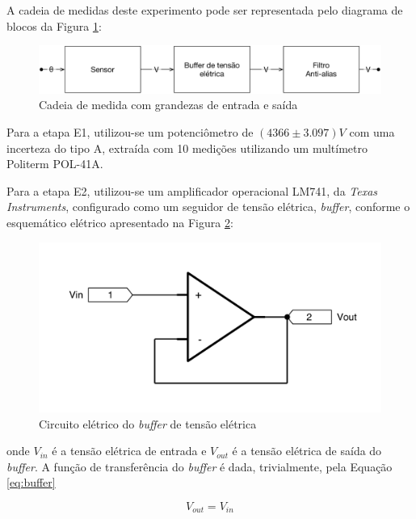 \documentclass[a4paper]{instrumentacao}
\begin{document}
A cadeia de medidas deste experimento pode ser representada pelo diagrama de blocos da Figura \ref{fig:pendulo-cadeia-medidas}:

\begin{figure}[H]
\centering
\includegraphics[width=\textwidth]{Cadeia de medida.pdf}
\caption{Cadeia de medida com grandezas de entrada e saída}
\label{fig:pendulo-cadeia-medidas}
\end{figure}

Para a etapa E1, utilizou-se um potenciômetro de $(4366 \pm 3.097) V$ com uma incerteza do tipo A, extraída com 10 medições utilizando um multímetro Politerm POL-41A.

Para a etapa E2, utilizou-se um amplificador operacional LM741\cite{datasheet-lm741}, da \textit{Texas Instruments}, configurado como um seguidor de tensão elétrica, \textit{buffer}, conforme o esquemático elétrico apresentado na Figura \ref{fig:buffer-tensão}:

\begin{figure}[H]
\centering
\includegraphics[width=\textwidth]{Buffer-tensao.pdf}
\caption{Circuito elétrico do \textit{buffer} de tensão elétrica}
\label{fig:buffer-tensão}
\end{figure}

\noindent
onde $V_{in}$ é a tensão elétrica de entrada e $V_{out}$ é a tensão elétrica de saída do \textit{buffer}. A função de transferência do \textit{buffer} é dada, trivialmente, pela Equação \ref{eq:buffer}

\begin{equation}
	V_{out} = V_{in}
	\label{eq:buffer}
\end{equation}
\end{document}
